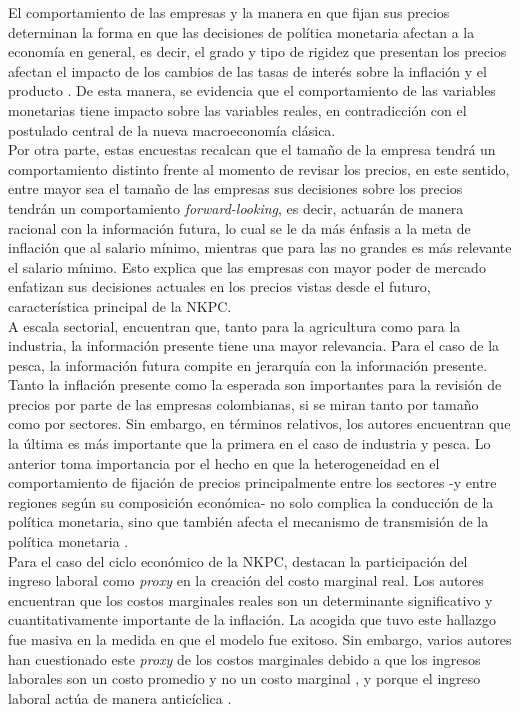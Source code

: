 El comportamiento de las empresas y la manera en que fijan sus precios determinan la forma en que las decisiones de política monetaria afectan a la economía en general, es decir, el grado y tipo de rigidez que presentan los precios afectan el impacto de los cambios de las tasas de interés sobre la inflación y el producto \citep{misas2009formacion}. De esta manera, se evidencia que el comportamiento de las variables monetarias tiene impacto sobre las variables reales, en contradicción con el postulado central de la nueva macroeconomía clásica.\\

Por otra parte, estas encuestas recalcan que el tamaño de la empresa tendrá un comportamiento distinto frente al momento de revisar los precios, en este sentido, entre mayor sea el tamaño de las empresas sus decisiones sobre los precios tendrán un comportamiento  \textit{forward-looking}, es decir, actuarán de manera racional con la información futura, lo cual se le da más énfasis a la meta de inflación que al salario mínimo, mientras que para las no grandes es más relevante el salario mínimo. Esto explica que las empresas con mayor poder de mercado enfatizan sus decisiones actuales en los precios vistas desde el futuro, característica principal de la NKPC.\\

A escala sectorial, \cite{misas2009formacion}  encuentran que, tanto para la agricultura como para la industria, la información presente tiene una mayor relevancia. Para el caso de la pesca, la información futura compite en jerarquía con la información presente. Tanto la inflación presente como la esperada son importantes para la revisión de precios por parte de las empresas colombianas, si se miran tanto por tamaño como por sectores. Sin embargo, en términos relativos, los autores encuentran que la última es más importante que la primera en el caso de industria y pesca. Lo anterior toma importancia por el hecho en que la  heterogeneidad en el comportamiento de fijación de precios principalmente entre los sectores -y entre regiones según su composición económica- no solo complica la conducción de la política monetaria, sino que también afecta el mecanismo de transmisión de la política monetaria \citep{romero2008transmision}.\\

Para el caso del ciclo económico de la NKPC, \cite{gali1999inflation}  destacan la participación del ingreso laboral como \textit{proxy} en la creación del costo marginal real. Los autores encuentran que los costos marginales reales son un determinante significativo y cuantitativamente importante de la inflación. La acogida que tuvo este hallazgo fue masiva en la medida en que el modelo fue exitoso. Sin embargo, varios autores han cuestionado este \textit{proxy} de los costos marginales debido a que los ingresos laborales son un costo promedio y no un costo marginal \citep{rudd2007modeling}, y porque el ingreso laboral actúa de manera anticíclica \citep{mazumder2010new}.\\

